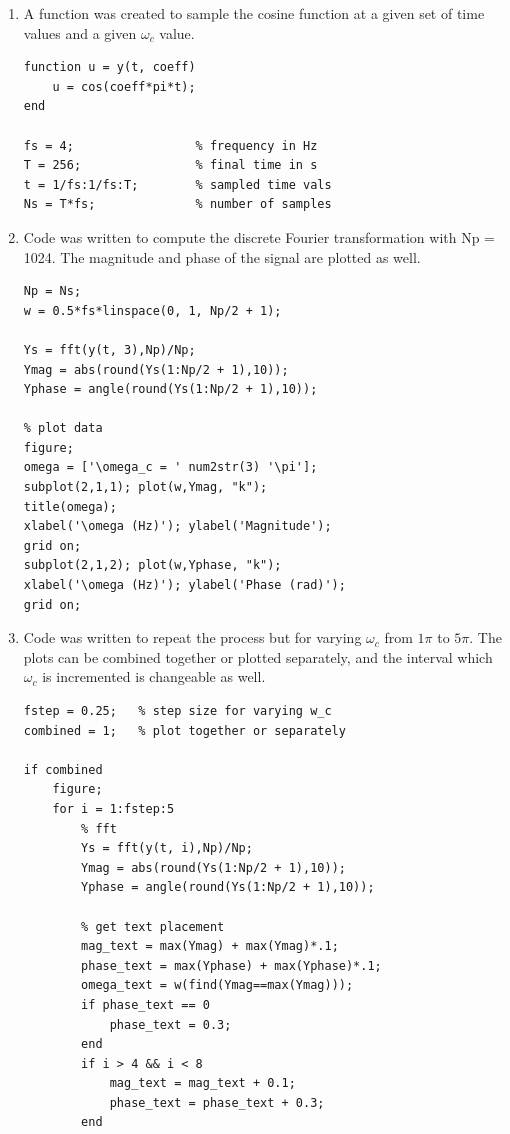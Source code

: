 \documentclass{article}
\begin{document}
\begin{enumerate}
    \item A function was created to sample the cosine function at a given set of time values and a given $\omega_c$ value.

        \begin{lstlisting}[style=Matlab-editor]
function u = y(t, coeff)
    u = cos(coeff*pi*t);
end

fs = 4;                 % frequency in Hz
T = 256;                % final time in s
t = 1/fs:1/fs:T;        % sampled time vals
Ns = T*fs;              % number of samples

    \end{lstlisting}
\item Code was written to compute the discrete Fourier transformation with Np = 1024. The magnitude and phase of the signal are plotted as well.
        \begin{lstlisting}[style=Matlab-editor]
Np = Ns;
w = 0.5*fs*linspace(0, 1, Np/2 + 1);

Ys = fft(y(t, 3),Np)/Np;
Ymag = abs(round(Ys(1:Np/2 + 1),10));
Yphase = angle(round(Ys(1:Np/2 + 1),10));
        
% plot data
figure;
omega = ['\omega_c = ' num2str(3) '\pi'];
subplot(2,1,1); plot(w,Ymag, "k");
title(omega);
xlabel('\omega (Hz)'); ylabel('Magnitude'); 
grid on;
subplot(2,1,2); plot(w,Yphase, "k");
xlabel('\omega (Hz)'); ylabel('Phase (rad)'); 
grid on;
        \end{lstlisting}

\item Code was written to repeat the process but for varying $\omega_c$ from $1\pi$ to $5\pi$. The plots can be combined together or plotted separately, and the interval which $\omega_c$ is incremented is changeable as well. 

        \begin{lstlisting}[style=Matlab-editor]
fstep = 0.25;   % step size for varying w_c
combined = 1;   % plot together or separately

if combined
    figure;
    for i = 1:fstep:5
        % fft
        Ys = fft(y(t, i),Np)/Np;
        Ymag = abs(round(Ys(1:Np/2 + 1),10));
        Yphase = angle(round(Ys(1:Np/2 + 1),10));
        
        % get text placement
        mag_text = max(Ymag) + max(Ymag)*.1;
        phase_text = max(Yphase) + max(Yphase)*.1;
        omega_text = w(find(Ymag==max(Ymag)));
        if phase_text == 0
            phase_text = 0.3;
        end
        if i > 4 && i < 8
            mag_text = mag_text + 0.1;
            phase_text = phase_text + 0.3;
        end
        

\end{lstlisting}
\end{enumerate}
\end{document}

